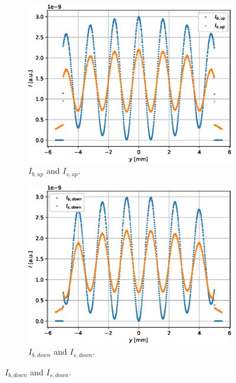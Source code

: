 \begin{figure}[htbp]
	\centering
	\begin{subfigure}[b]{0.45\textwidth}
		\centering
		\includegraphics[width=\textwidth]{simulation-raw-intensity-up}
		\caption{$I_{b,up}$ and $I_{s,up}$.}
		\label{fig:simulation-raw-intensity-up}
	\end{subfigure}
	\hfill
	\begin{subfigure}[b]{0.45\textwidth}
		\centering
		\includegraphics[width=\textwidth]{simulation-raw-intensity-down}
		\caption{$I_{b,down}$ and $I_{s,down}$.}
		\label{fig:simulation-raw-intensity-down}
	\end{subfigure}

\end{figure}

